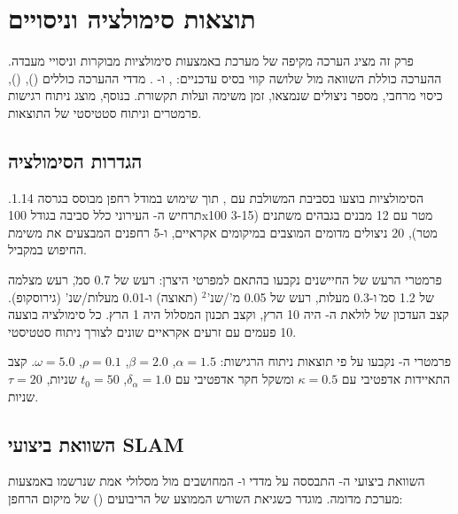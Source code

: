 

\section{תוצאות סימולציה וניסויים}
\label{sec:ch08_results}

פרק זה מציג הערכה מקיפה של מערכת  באמצעות סימולציות מבוקרות וניסויי מעבדה. ההערכה כוללת השוואה מול שלושה קווי בסיס עדכניים:  \cite{Campos2021ORBSLAM3},  \cite{Lajoie2023SwarmSLAM} ו- \cite{Xu2024D2SLAM}. מדדי ההערכה כוללים  (),  (), כיסוי מרחבי, מספר ניצולים שנמצאו, זמן משימה ועלות תקשורת. בנוסף, מוצג ניתוח רגישות פרמטרים וניתוח סטטיסטי של התוצאות.

\subsection{הגדרות הסימולציה}
\label{sec:ch08_simulation_setup}

הסימולציות בוצעו בסביבת  המשולבת עם , תוך שימוש במודל רחפן מבוסס  בגרסה 1.14. תרחיש ה- העירוני כלל סביבה בגודל 100x100 מטר עם 12 מבנים בגבהים משתנים (3-15 מטר), 20 ניצולים מדומים המוצבים במיקומים אקראיים, ו-5 רחפנים המבצעים את משימת החיפוש במקביל.

פרמטרי הרעש של החיישנים נקבעו בהתאם למפרטי היצרן: רעש  של 0.7 ס\"מ, רעש מצלמה של 1.2 ס\"מ ו-0.3 מעלות, רעש  של 0.05 מ'/שנ'$^2$ (תאוצה) ו-0.01 מעלות/שנ' (גירוסקופ). קצב העדכון של לולאת ה- היה 10 הרץ, וקצב תכנון המסלול היה 1 הרץ. כל סימולציה בוצעה 10 פעמים עם זרעים אקראיים שונים לצורך ניתוח סטטיסטי.

פרמטרי ה- נקבעו על פי תוצאות ניתוח הרגישות: $\alpha = 1.5$, $\beta = 2.0$, $\rho = 0.1$, $\omega = 5.0$. קצב התאיידות אדפטיבי עם $\kappa = 0.5$ ומשקל חקר אדפטיבי עם $\delta_{\alpha} = 1.0$, $t_0 = 50$ שניות, $\tau = 20$ שניות.

\subsection{השוואת ביצועי SLAM}
\label{sec:ch08_slam_comparison}

השוואת ביצועי ה- התבססה על מדדי  ו- המחושבים מול מסלולי אמת שנרשמו באמצעות מערכת  מדומה.  מוגדר כשגיאת השורש הממוצע של הריבועים () של מיקום הרחפן:

